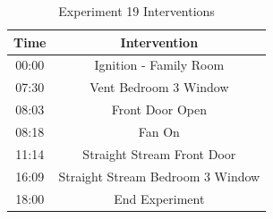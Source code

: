 \documentclass{article}
\begin{document}
\begin{table}[H]
	\centering
	\caption{Experiment 19 Interventions}
	\begin{tabular}{|c|c|} 
		\hline
		Time & Intervention \\ \hline \hline
		00:00 & Ignition - Family Room \\ \hline
		07:30 & Vent Bedroom 3 Window \\ \hline
		08:03 & Front Door Open \\ \hline
		08:18 & Fan On \\ \hline
		11:14 & Straight Stream Front Door \\ \hline
		16:09 & Straight Stream Bedroom 3 Window \\ \hline
		18:00 & End Experiment \\ \hline
	\end{tabular}
	\label{Table:Exp19Interventions}
\end{table}
\end{document}
